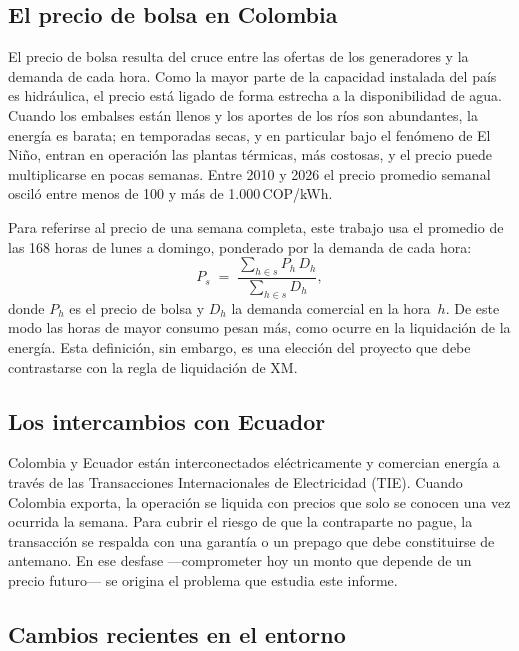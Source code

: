 \documentclass[11pt,letterpaper]{article}
\newcommand{\cop}{\,COP/kWh}
\begin{document}
\subsection{El precio de bolsa en Colombia}

El precio de bolsa resulta del cruce entre las ofertas de los
generadores y la demanda de cada hora. Como la mayor parte de la
capacidad instalada del país es hidráulica, el precio está ligado de
forma estrecha a la disponibilidad de agua. Cuando los embalses están
llenos y los aportes de los ríos son abundantes, la energía es barata;
en temporadas secas, y en particular bajo el fenómeno de El Niño, entran
en operación las plantas térmicas, más costosas, y el precio puede
multiplicarse en pocas semanas. Entre 2010 y 2026 el precio promedio
semanal osciló entre menos de 100 y más de 1.000\cop.

Para referirse al precio de una semana completa, este trabajo usa el
promedio de las 168 horas de lunes a domingo, ponderado por la demanda
de cada hora:
\begin{equation}
  P_s \;=\; \frac{\sum_{h\in s} P_h\,D_h}{\sum_{h\in s} D_h},
  \label{eq:precio}
\end{equation}
donde $P_h$ es el precio de bolsa y $D_h$ la demanda comercial en la
hora~$h$. De este modo las horas de mayor consumo pesan más, como ocurre
en la liquidación de la energía. Esta definición, sin embargo, es una
elección del proyecto que debe contrastarse con la regla de liquidación
de XM.

\subsection{Los intercambios con Ecuador}

Colombia y Ecuador están interconectados eléctricamente y comercian
energía a través de las Transacciones Internacionales de Electricidad
(TIE). Cuando Colombia exporta, la operación se liquida con precios que
solo se conocen una vez ocurrida la semana. Para cubrir el riesgo de que
la contraparte no pague, la transacción se respalda con una garantía o
un prepago que debe constituirse de antemano. En ese desfase
---comprometer hoy un monto que depende de un precio futuro--- se
origina el problema que estudia este informe.

\subsection{Cambios recientes en el entorno}
\end{document}
